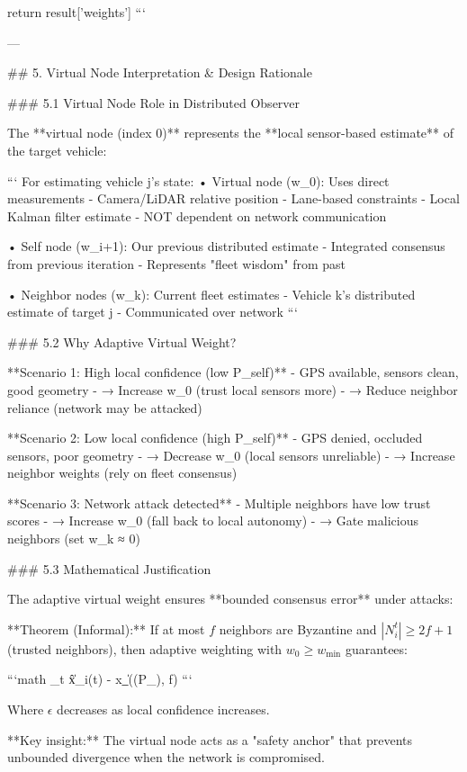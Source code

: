         return result['weights']
```

---

## 5. Virtual Node Interpretation & Design Rationale

### 5.1 Virtual Node Role in Distributed Observer

The **virtual node (index 0)** represents the **local sensor-based estimate** of the target vehicle:

```
For estimating vehicle j's state:
  • Virtual node (w_0): Uses direct measurements
    - Camera/LiDAR relative position
    - Lane-based constraints
    - Local Kalman filter estimate
    - NOT dependent on network communication
  
  • Self node (w_{i+1}): Our previous distributed estimate
    - Integrated consensus from previous iteration
    - Represents "fleet wisdom" from past
  
  • Neighbor nodes (w_k): Current fleet estimates
    - Vehicle k's distributed estimate of target j
    - Communicated over network
```

### 5.2 Why Adaptive Virtual Weight?

**Scenario 1: High local confidence (low P_self)**
- GPS available, sensors clean, good geometry
- → Increase w_0 (trust local sensors more)
- → Reduce neighbor reliance (network may be attacked)

**Scenario 2: Low local confidence (high P_self)**
- GPS denied, occluded sensors, poor geometry
- → Decrease w_0 (local sensors unreliable)
- → Increase neighbor weights (rely on fleet consensus)

**Scenario 3: Network attack detected**
- Multiple neighbors have low trust scores
- → Increase w_0 (fall back to local autonomy)
- → Gate malicious neighbors (set w_k ≈ 0)

### 5.3 Mathematical Justification

The adaptive virtual weight ensures **bounded consensus error** under attacks:

**Theorem (Informal):** If at most \(f\) neighbors are Byzantine and \(|N_i^t| \geq 2f + 1\) (trusted neighbors), then adaptive weighting with \(w_0 \geq w_{\min}\) guarantees:

```math
\lim_{t \to \infty} \|x̂_i(t) - x_{}\| \leq \epsilon((P_{}), f)
```

Where \(\epsilon\) decreases as local confidence increases.

**Key insight:** The virtual node acts as a "safety anchor" that prevents unbounded divergence when the network is compromised.

